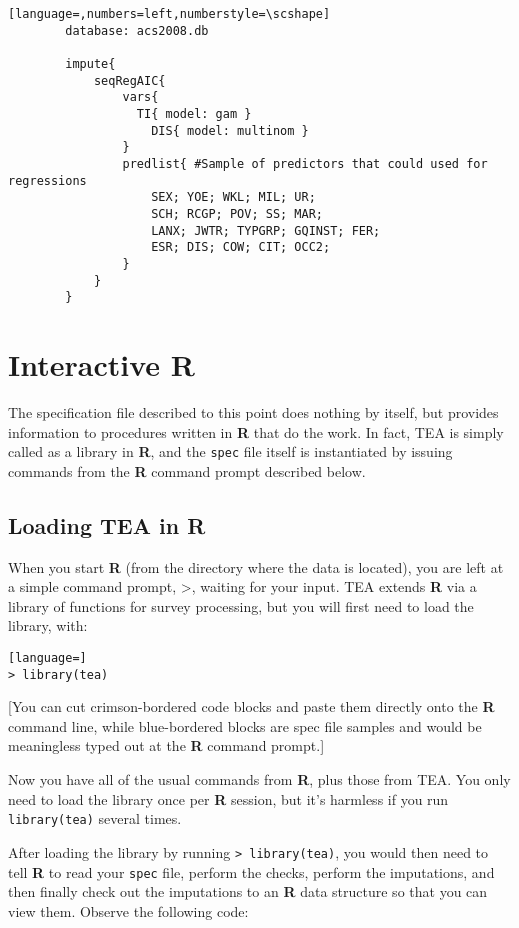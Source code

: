 \documentclass{article}
\begin{document}
        \begin{lstlisting}[language=,numbers=left,numberstyle=\scshape]
        database: acs2008.db

        impute{
            seqRegAIC{
                vars{
                  TI{ model: gam }
                    DIS{ model: multinom }
                }
                predlist{ #Sample of predictors that could used for regressions
                    SEX; YOE; WKL; MIL; UR;
                    SCH; RCGP; POV; SS; MAR;
                    LANX; JWTR; TYPGRP; GQINST; FER;
                    ESR; DIS; COW; CIT; OCC2;
                }
            }
        }

        \end{lstlisting}


\section{Interactive R}
The specification file described to this point does nothing by itself, but provides
information to procedures written in \textbf{R} that do the work. In fact, TEA is simply 
called as a library in \textbf{R}, and the {\tt spec} file itself is instantiated by 
issuing commands from the \textbf{R} command prompt described below.

\subsection{Loading TEA in R}
When you start \textbf{R} (from the directory where the data is located), you are left at a
simple command prompt, >, waiting for your input. TEA extends \textbf{R} via a library of
functions for survey processing, but you will first need to load the library, with:
\begin{lstlisting}[language=]
> library(tea)
\end{lstlisting}

[You can cut crimson-bordered code blocks and paste them directly onto the \textbf{R}
command line, while blue-bordered blocks are spec file samples and
would be meaningless typed out at the \textbf{R} command prompt.]

Now you have all of the usual commands from \textbf{R}, plus those from TEA. You only
need to load the library once per \textbf{R} session, but it's harmless if you run
{\tt library(tea)} several times.

After loading the library by running {\tt > library(tea)}, you would then need to 
tell \textbf{R} to read your {\tt spec} file, perform the checks, perform the imputations, 
and then finally check out the imputations to an \textbf{R} data structure so that you 
can view them. Observe the following code:
\end{document}
